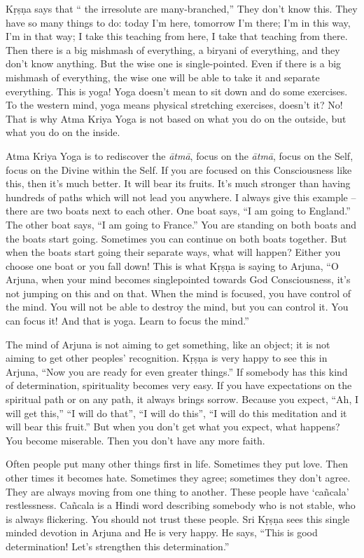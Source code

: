 Kṛṣṇa says that “ the irresolute are many-branched,” They don’t know this. They have so many things to do: today I’m here, tomorrow I’m there; I’m in this way, I’m in that way; I take this teaching from here, I take that teaching from there. Then there is a big mishmash of everything, a biryani of everything, and they don’t know anything. But the wise one is single-pointed. Even if there is a big mishmash of everything, the wise one will be able to take it and separate everything. This is yoga! Yoga doesn’t mean to sit down and do some exercises. To the western mind, yoga means physical stretching exercises, doesn’t it? No! That is why Atma Kriya Yoga is not based on what you do on the outside, but what you do on the inside.

Atma Kriya Yoga is to rediscover the \textit{ātmā}, focus on the \textit{ātmā}, focus on the Self, focus on the Divine within the Self. If you are focused on this Consciousness like this, then it’s much better. It will bear its fruits. It’s much stronger than having hundreds of paths which will not lead you anywhere. I always give this example – there are two boats next to each other. One boat says, “I am going to England.” The other boat says, “I am going to France.” You are standing on both boats and the boats start going. Sometimes you can continue on both boats together. But when the boats start going their separate ways, what will happen? Either you choose one boat or you fall down! This is what Kṛṣṇa is saying to Arjuna, “O Arjuna, when your mind becomes singlepointed towards God Consciousness, it’s not jumping on this and on that. When the mind is focused, you have control of the mind. You will not be able to destroy the mind, but you can control it. You can focus it! And that is yoga. Learn to focus the mind.”

The mind of Arjuna is not aiming to get something, like an object; it is not aiming to get other peoples’ recognition. Kṛṣṇa is very happy to see this in Arjuna, “Now you are ready for even greater things.” If somebody has this kind of determination, spirituality becomes very easy. If you have expectations on the spiritual path or on any path, it always brings sorrow. Because you expect, “Ah, I will get this,” “I will do that”, “I will do this”, “I will do this meditation and it will bear this fruit.” But when you don’t get what you expect, what happens? You become miserable. Then you don’t have any more faith.

Often people put many other things first in life. Sometimes they put love. Then other times it becomes hate. Sometimes they agree; sometimes they don’t agree. They are always moving from one thing to another. These people have ‘cañcala’ restlessness. Cañcala is a Hindi word describing somebody who is not stable, who is always flickering. You should not trust these people. Sri Kṛṣṇa sees this single minded devotion in Arjuna and He is very happy. He says, “This is good determination! Let’s strengthen this determination.”

